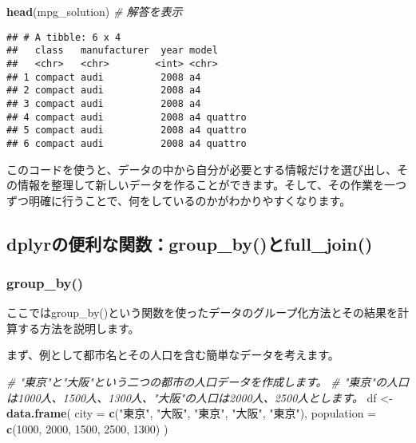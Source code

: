 \documentclass[
]{article}
\newenvironment{Shaded}{\begin{snugshade}}{\end{snugshade}}
\newcommand{\AttributeTok}[1]{\textcolor[rgb]{0.13,0.29,0.53}{#1}}
\newcommand{\CommentTok}[1]{\textcolor[rgb]{0.56,0.35,0.01}{\textit{#1}}}
\newcommand{\DecValTok}[1]{\textcolor[rgb]{0.00,0.00,0.81}{#1}}
\newcommand{\FunctionTok}[1]{\textcolor[rgb]{0.13,0.29,0.53}{\textbf{#1}}}
\newcommand{\NormalTok}[1]{#1}
\newcommand{\OtherTok}[1]{\textcolor[rgb]{0.56,0.35,0.01}{#1}}
\newcommand{\StringTok}[1]{\textcolor[rgb]{0.31,0.60,0.02}{#1}}
\begin{document}
\begin{Shaded}
\begin{Highlighting}[]
\FunctionTok{head}\NormalTok{(mpg\_solution)  }\CommentTok{\# 解答を表示}
\end{Highlighting}
\end{Shaded}

\begin{verbatim}
## # A tibble: 6 x 4
##   class   manufacturer  year model     
##   <chr>   <chr>        <int> <chr>     
## 1 compact audi          2008 a4        
## 2 compact audi          2008 a4        
## 3 compact audi          2008 a4        
## 4 compact audi          2008 a4 quattro
## 5 compact audi          2008 a4 quattro
## 6 compact audi          2008 a4 quattro
\end{verbatim}

このコードを使うと、データの中から自分が必要とする情報だけを選び出し、その情報を整理して新しいデータを作ることができます。そして、その作業を一つずつ明確に行うことで、何をしているのかがわかりやすくなります。

\hypertarget{dplyrux306eux4fbfux5229ux306aux95a2ux6570group_byux3068full_join}{%
\subsection{dplyrの便利な関数：group\_by()とfull\_join()}\label{dplyrux306eux4fbfux5229ux306aux95a2ux6570group_byux3068full_join}}

\hypertarget{group_by}{%
\subsubsection{group\_by()}\label{group_by}}

ここではgroup\_by()という関数を使ったデータのグループ化方法とその結果を計算する方法を説明します。

まず、例として都市名とその人口を含む簡単なデータを考えます。

\begin{Shaded}
\begin{Highlighting}[]
\CommentTok{\# "東京"と"大阪"という二つの都市の人口データを作成します。}
\CommentTok{\# "東京"の人口は1000人、1500人、1300人、"大阪"の人口は2000人、2500人とします。}
\NormalTok{df }\OtherTok{\textless{}{-}} \FunctionTok{data.frame}\NormalTok{(}
  \AttributeTok{city =} \FunctionTok{c}\NormalTok{(}\StringTok{"東京"}\NormalTok{, }\StringTok{"大阪"}\NormalTok{, }\StringTok{"東京"}\NormalTok{, }\StringTok{"大阪"}\NormalTok{, }\StringTok{"東京"}\NormalTok{),}
  \AttributeTok{population =} \FunctionTok{c}\NormalTok{(}\DecValTok{1000}\NormalTok{, }\DecValTok{2000}\NormalTok{, }\DecValTok{1500}\NormalTok{, }\DecValTok{2500}\NormalTok{, }\DecValTok{1300}\NormalTok{)}
\NormalTok{)}
\end{Highlighting}
\end{Shaded}
\end{document}
